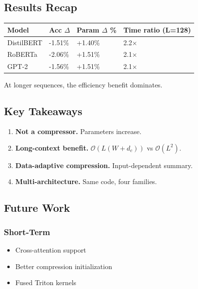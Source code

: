 \subsection{Results Recap}

\begin{table}[H]
\centering
\small
\begin{tabular}{llll}
\toprule
\textbf{Model} & \textbf{Acc $\Delta$} & \textbf{Param $\Delta$ \%} & \textbf{Time ratio (L=128)} \\
\midrule
DistilBERT & -1.51\% & +1.40\% & 2.2$\times$ \\
RoBERTa & -2.06\% & +1.51\% & 2.1$\times$ \\
GPT-2 & -1.56\% & +1.51\% & 2.1$\times$ \\
\bottomrule
\end{tabular}
\end{table}

At longer sequences, the efficiency benefit dominates.

\subsection{Key Takeaways}

\begin{enumerate}
\item \textbf{Not a compressor.} Parameters increase.
\item \textbf{Long-context benefit.} $\mathcal{O}(L(W + d_c))$ vs $\mathcal{O}(L^2)$.
\item \textbf{Data-adaptive compression.} Input-dependent summary.
\item \textbf{Multi-architecture.} Same code, four families.

\end{enumerate}
\subsection{Future Work}

\subsubsection{Short-Term}
\begin{itemize}
\item Cross-attention support
\item Better compression initialization
\item Fused Triton kernels

\end{itemize}
